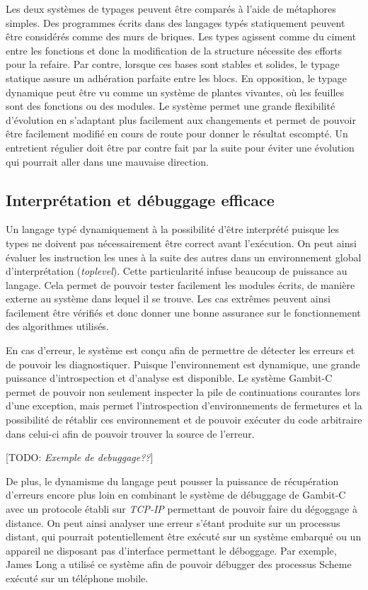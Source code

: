 \documentclass[12pt,oneside,letterpaper,francais]{book}
\newcommand{\todo}[1]{[TODO: {\it #1}]}
\begin{document}
Les deux systèmes de typages peuvent être comparés à l'aide de
métaphores simples. Des programmes écrits dans des langages typés
statiquement peuvent être considérés comme des murs de briques. Les
types agissent comme du ciment entre les fonctions et donc la
modification de la structure nécessite des efforts pour la
refaire. Par contre, lorsque ces bases sont stables et solides, le
typage statique assure un adhération parfaite entre les blocs.  En
opposition, le typage dynamique peut être vu comme un système de
plantes vivantes, où les feuilles sont des fonctions ou des
modules. Le système permet une grande flexibilité d'évolution en
s'adaptant plus facilement aux changements et permet de pouvoir être
facilement modifié en cours de route pour donner le résultat
escompté. Un entretient régulier doit être par contre fait par la
suite pour éviter une évolution qui pourrait aller dans une mauvaise
direction.


\subsection{Interprétation et débuggage efficace}

Un langage typé dynamiquement à la possibilité d'être interprété
puisque les types ne doivent pas nécessairement être correct avant
l'exécution. On peut ainsi évaluer les instruction les unes à la suite
des autres dans un environnement global d'interprétation
(\textit{toplevel}). Cette particularité infuse beaucoup de puissance
au langage. Cela permet de pouvoir tester facilement les modules
écrits, de manière externe au système dans lequel il se trouve. Les
cas extrêmes peuvent ainsi facilement être vérifiés et donc donner une
bonne assurance sur le fonctionnement des algorithmes utilisés.

En cas d'erreur, le système est conçu afin de permettre de détecter
les erreurs et de pouvoir les diagnostiquer. Puisque l'environnement
est dynamique, une grande puissance d'introspection et d'analyse est
disponible. Le système Gambit-C permet de pouvoir non seulement
inspecter la pile de continuations courantes lors d'une exception,
mais permet l'introspection d'environnements de fermetures et la
possibilité de rétablir ces environnement et de pouvoir exécuter du
code arbitraire dans celui-ci afin de pouvoir trouver la source de
l'erreur. 

\todo{Exemple de debuggage??}

De plus, le dynamisme du langage peut pousser la puissance de
récupération d'erreurs encore plus loin en combinant le système de
débuggage de Gambit-C avec un protocole établi sur \textit{TCP-IP}
permettant de pouvoir faire du dégoggage à distance. On peut ainsi
analyser une erreur s'étant produite sur un processus distant, qui
pourrait potentiellement être exécuté sur un système embarqué ou un
appareil ne disposant pas d'interface permettant le déboggage. Par
exemple, James Long a utilisé ce système afin de pouvoir débugger des
processus Scheme exécuté sur un téléphone mobile.
\end{document}
